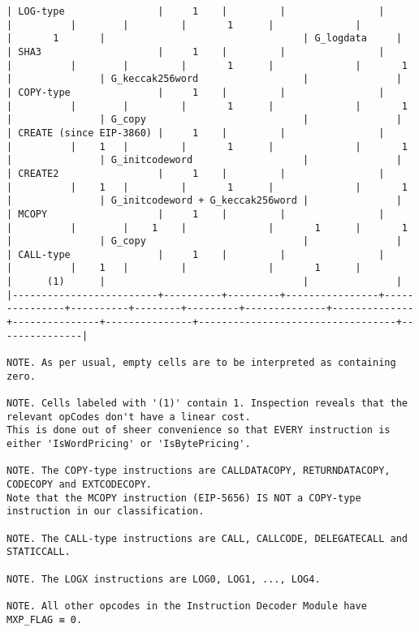 \documentclass[varwidth=\maxdimen,margin=0.5cm,multi={verbatim}]{standalone}
\begin{document}
\begin{verbatim}
| LOG-type                |     1    |         |                |               |          |        |         |       1      |              |               |       1       |                                  | G_logdata     |
| SHA3                    |     1    |         |                |               |          |        |         |       1      |              |       1       |               | G_keccak256word                  |               |
| COPY-type               |     1    |         |                |               |          |        |         |       1      |              |       1       |               | G_copy                           |               |
| CREATE (since EIP-3860) |     1    |         |                |               |          |    1   |         |       1      |              |       1       |               | G_initcodeword                   |               |
| CREATE2                 |     1    |         |                |               |          |    1   |         |       1      |              |       1       |               | G_initcodeword + G_keccak256word |               |
| MCOPY                   |     1    |         |                |               |          |        |    1    |              |       1      |       1       |               | G_copy                           |               |
| CALL-type               |     1    |         |                |               |          |    1   |         |              |       1      |               |      (1)      |                                  |               |
|-------------------------+----------+---------+----------------+---------------+----------+--------+---------+--------------+--------------+---------------+---------------+----------------------------------+---------------|

NOTE. As per usual, empty cells are to be interpreted as containing zero.

NOTE. Cells labeled with '(1)' contain 1. Inspection reveals that the relevant opCodes don't have a linear cost.
This is done out of sheer convenience so that EVERY instruction is either 'IsWordPricing' or 'IsBytePricing'.

NOTE. The COPY-type instructions are CALLDATACOPY, RETURNDATACOPY, CODECOPY and EXTCODECOPY.
Note that the MCOPY instruction (EIP-5656) IS NOT a COPY-type instruction in our classification.

NOTE. The CALL-type instructions are CALL, CALLCODE, DELEGATECALL and STATICCALL.

NOTE. The LOGX instructions are LOG0, LOG1, ..., LOG4.

NOTE. All other opcodes in the Instruction Decoder Module have MXP_FLAG ≡ 0.

\end{verbatim}
\end{document}
